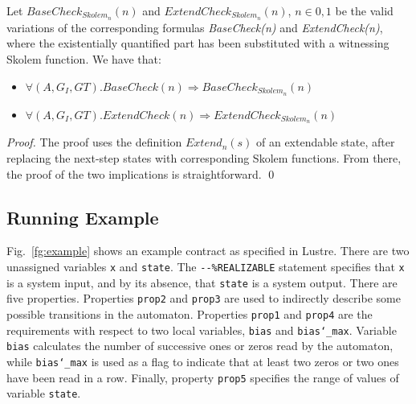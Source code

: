 \begin{theorem} Let $BaseCheck_{Skolem_n}(n)$ and
$ExtendCheck_{Skolem_n}(n)$, $n \in {0,1}$ be the valid
variations of the corresponding formulas \textit{BaseCheck(n)} and
\textit{ExtendCheck(n)}, where the existentially quantified part has been substituted
with a witnessing Skolem function. We have that:
\begin{itemize}
\item $\forall (A,G_{I},G{T}). BaseCheck(n) \Rightarrow BaseCheck_{Skolem_n}(n)$
\item $\forall (A,G_{I},G{T}). ExtendCheck(n) \Rightarrow
ExtendCheck_{Skolem_n}(n)$
\end{itemize}
\end{theorem}
\begin{proof}
The proof uses the definition \textit{$Extend_n(s)$} of an extendable state,
after replacing the next-step states with corresponding Skolem functions. From there,
the proof of the two implications is straightforward.
\qed
\end{proof}

\subsection{Running Example}

Fig.~\ref{fg:example} shows an example contract as specified in
Lustre. There are two unassigned variables \texttt{x} and
\texttt{state}. The \texttt{{-}{-}\%REALIZABLE} statement specifies
that \texttt{x} is a system input, and by its absence, that
\texttt{state} is a system output. There are five properties.
Properties \texttt{prop2} and \texttt{prop3} are used to indirectly
describe some possible transitions in the automaton. Properties
\texttt{prop1} and \texttt{prop4} are the requirements with respect to
two local variables, \texttt{bias} and \texttt{bias\char`_max}.
Variable \texttt{bias} calculates the number of successive ones or
zeros read by the automaton, while \texttt{bias\char`_max} is used as
a flag to indicate that at least two zeros or two ones have been read
in a row. Finally, property \texttt{prop5} specifies the range of
values of variable \texttt{state}.


